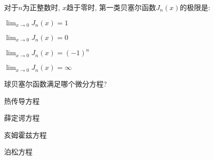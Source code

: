 \documentclass{njustexam}
\begin{document}
\begin{problem}
  对于$n$为正整数时, $x$趋于零时, 第一类贝塞尔函数$J_n(x)$的极限是:

  \begin{abcd}
\item $\lim_{x \to 0} J_n(x) = 1$

\item $\lim_{x \to 0} J_n(x) = 0$

\item $\lim_{x \to 0} J_n(x) = (-1)^n$

\item $\lim_{x \to 0} J_n(x) = \infty$
 \end{abcd}
\end{problem}


\begin{problem}
  球贝塞尔函数满足哪个微分方程? 

  \begin{abcd}
    \item 热传导方程
    \item 薛定谔方程
    \item 亥姆霍兹方程
    \item 泊松方程
  \end{abcd}
\end{problem}

\end{document}
